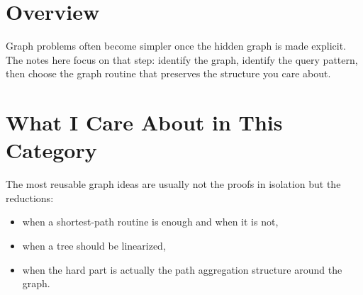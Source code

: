 \section*{Overview}

Graph problems often become simpler once the hidden graph is made explicit. The notes here focus on that step:
identify the graph, identify the query pattern, then choose the graph routine that preserves the structure you care
about.

\section*{What I Care About in This Category}

The most reusable graph ideas are usually not the proofs in isolation but the reductions:

\begin{itemize}
  \item when a shortest-path routine is enough and when it is not,
  \item when a tree should be linearized,
  \item when the hard part is actually the path aggregation structure around the graph.
\end{itemize}
